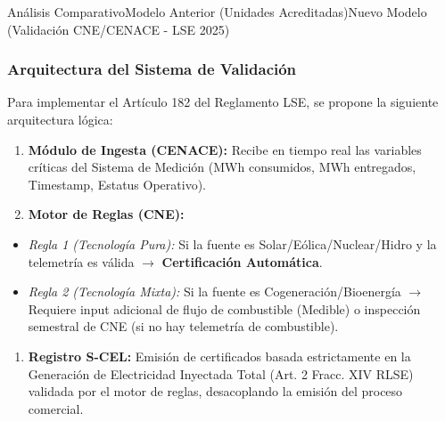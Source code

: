 \documentclass{cel}
\begin{document}
\vspace{0.3cm}
\begin{tablaParadigmaV2}{Análisis Comparativo}{Modelo Anterior (Unidades Acreditadas)}{Nuevo Modelo (Validación CNE/CENACE - LSE 2025)}
\end{tablaParadigmaV2}

\subsubsection{Arquitectura del Sistema de Validación}
\nopagebreak

Para implementar el Artículo 182 del Reglamento LSE, se propone la siguiente arquitectura lógica:


\begin{enumerate}
\item \textbf{Módulo de Ingesta (CENACE):} Recibe en tiempo real las variables críticas del Sistema de Medición (MWh consumidos, MWh entregados, Timestamp, Estatus Operativo).
\item \textbf{Motor de Reglas (CNE):}
\end{enumerate}
\begin{itemize}
\item \textit{Regla 1 (Tecnología Pura):} Si la fuente es Solar/Eólica/Nuclear/Hidro y la telemetría es válida  $\rightarrow$  \textbf{Certificación Automática}.
\item \textit{Regla 2 (Tecnología Mixta):} Si la fuente es Cogeneración/Bioenergía  $\rightarrow$  Requiere input adicional de flujo de combustible (Medible) o inspección semestral de CNE (si no hay telemetría de combustible).
\end{itemize}
\begin{enumerate}
\item \textbf{Registro S-CEL:} Emisión de certificados basada estrictamente en la \textquotedbl{}Generación de Electricidad Inyectada Total\textquotedbl{} (Art. 2 Fracc. XIV RLSE) validada por el motor de reglas, desacoplando la emisión del proceso comercial.

\end{enumerate}
\end{document}
